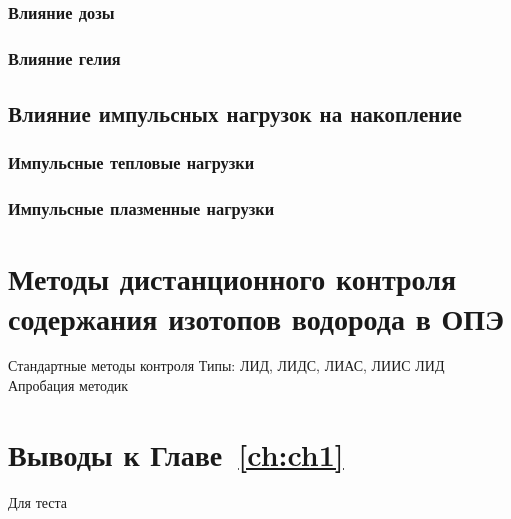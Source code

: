 \subsubsection{Влияние дозы}

\subsubsection{Влияние гелия}

\subsection{Влияние импульсных нагрузок на накопление}

\subsubsection{Импульсные тепловые нагрузки}

\subsubsection{Импульсные плазменные нагрузки}

\section{Методы дистанционного контроля содержания изотопов водорода в ОПЭ}\label{sec:ch1/sec5}

Стандартные методы контроля
Типы: ЛИД, ЛИДС, ЛИАС, ЛИИС
ЛИД
Апробация методик

\section{Выводы к Главе~\ref{ch:ch1}}\label{sec:ch1/sec6}

Для теста~\autocite{Kulagin2022a_rus}


\FloatBarrier
